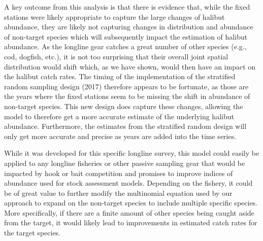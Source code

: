 \documentclass[12pt]{article}\usepackage[]{graphicx}\usepackage[]{color}
\begin{document}
A key outcome from this analysis is that there is evidence that, while the fixed stations were likely appropriate to capture the large changes of halibut abundance, they are likely not capturing changes in distribution and abundance of non-target species which will subsequently impact the estimation of halibut abundance. As the longline gear catches a great number of other species (e.g., cod, dogfish, etc.), it is not too surprising that their overall joint spatial distribution would shift which, as we have shown, would then have an impact on the halibut catch rates. The timing of the implementation of the stratified random sampling design (2017) therefore appears to be fortunate, as those are the years where the fixed stations seem to be missing the shift in abundance of non-target species. This new design does capture these changes, allowing the model to therefore get a more accurate estimate of the underlying halibut abundance. Furthermore, the estimates from the stratified random design will only get more accurate and precise as years are added into the time series.

While it was developed for this specific longline survey, this model could easily be applied to any longline fisheries or other passive sampling gear that would be impacted by hook or bait competition and promises to improve indices of abundance used for stock assessment models. Depending on the fishery, it could be of great value to further modify the multinomial equation used by our approach to expand on the non-target species to include multiple specific species. More specifically, if there are a finite amount of other species being caught aside from the target, it would likely lead to improvements in estimated catch rates for the target species.
\end{document}
